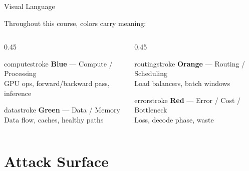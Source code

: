\documentclass[aspectratio=169, 12pt]{beamer}
\begin{document}
\begin{frame}{Visual Language}

\small
Throughout this course, colors carry meaning:

\vspace{0.3cm}
\begin{columns}[T]
  \begin{column}{0.45\textwidth}
    \begin{mlsyscard}{computestroke}
    \textbf{Blue} --- Compute / Processing\\
    {\footnotesize GPU ops, forward/backward pass, inference}
    \end{mlsyscard}
    \vspace{0.15cm}
    \begin{mlsyscard}{datastroke}
    \textbf{Green} --- Data / Memory\\
    {\footnotesize Data flow, caches, healthy paths}
    \end{mlsyscard}
  \end{column}
  \begin{column}{0.45\textwidth}
    \begin{mlsyscard}{routingstroke}
    \textbf{Orange} --- Routing / Scheduling\\
    {\footnotesize Load balancers, batch windows}
    \end{mlsyscard}
    \vspace{0.15cm}
    \begin{mlsyscard}{errorstroke}
    \textbf{Red} --- Error / Cost / Bottleneck\\
    {\footnotesize Loss, decode phase, waste}
    \end{mlsyscard}
  \end{column}
\end{columns}
\end{frame}



\section{Attack Surface}
\end{document}
